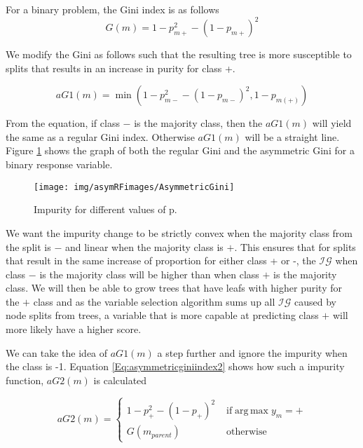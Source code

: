 \documentclass[twoside,11pt]{article}
\begin{document}
For a binary problem, the Gini index is as follows
\begin{equation}\label{eqn:giniindex}
	G(m)=1-p_{m+}^2-(1-p_{m+})^2
\end{equation}

We modify the Gini as follows such that the resulting tree is more susceptible to splits that results in an increase in purity for class +. 

\begin{equation}\label{eqn:asymmetricginiindex1}
	aG1(m)=\min(1-p_{m-}^2-(1-p_{m-})^2, 1-p_{m(+)})
\end{equation}

From the equation, if class $-$ is the majority class, then the $aG1(m)$ will yield the same as a regular Gini index. Otherwise  $aG1(m)$ will be a straight line. Figure \ref{Fig:Quantile Regression} shows the graph of both the regular Gini and the asymmetric Gini for a binary response variable.

\begin{figure}
 \centering
\texttt{[image: img/asymRFimages/AsymmetricGini]}\\
 \caption{Impurity for different values of p.}
 \label{Fig:Quantile Regression}
\end{figure}

We want the impurity change to be strictly convex when the majority class from the split is $-$ and linear when the majority class is $+$. This ensures that for splits that result in the same increase of proportion for either class + or -, the $\mathcal{IG}$ when class $-$ is the majority class will be higher than when class $+$ is the majority class. We will then be able to grow trees that have leafs with higher purity for the $+$ class and as the variable selection algorithm sums up all $\mathcal{IG}$ caused by node splits from trees, a variable that is more capable at predicting class $+$ will more likely have a higher score. 

We can take the idea of $aG1(m)$ a step further and ignore the impurity when the class is -1. Equation \ref{Eq:asymmetricginiindex2} shows how such a impurity function, $aG2(m)$ is calculated

\begin{equation}\label{Eq:asymmetricginiindex2}
aG2(m)=
\begin{cases} 1-p_{+}^2-(1-p_{+})^2 & \text{ if} \operatorname{arg\,max} y_m = + 
\\ G(m_{parent})&\text{ otherwise}
\end{cases}
\end{equation}
\end{document}
